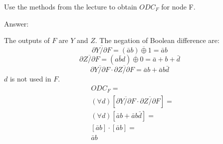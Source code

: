 \documentclass[12pt]{article}
\begin{document}
Use the methods from the lecture to obtain $ODC_F$ for node F.

Answer:

The outputs of $F$ are $Y$ and $Z$.
The negation of Boolean difference are:
\[\overline{\partial{Y}/\partial F} = (\bar{a}b) \overline\oplus 1 = \bar{a}b\]
\[\overline{\partial{Z}/\partial F} = (a\bar{b}d) \overline\oplus 0 = \bar{a}+b+\bar{d}\]
\[\overline{\partial{Y}/\partial F}\cdot \overline{\partial{Z}/\partial F} = \bar{a}b + \bar{a}b\bar{d}\]
$d$ is not used in $F$.
\[
    \begin{split}
        & ODC_F = \\
        & (\forall{d})[\overline{\partial{Y}/\partial F}\cdot \overline{\partial{Z}/\partial F}] = \\
        & (\forall{d})[\bar{a}b + \bar{a}b\bar{d}] = \\
        & [\bar{a}b] \cdot [\bar{a}b] = \\
        & \bar{a}b 
    \end{split}
\]
\end{document}
